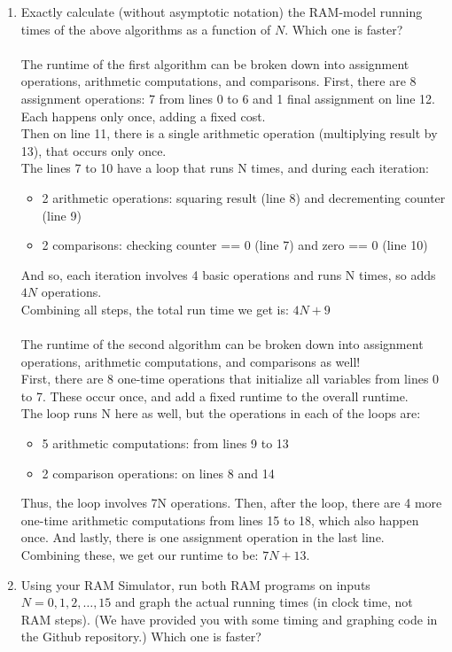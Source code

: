 \documentclass[11pt]{article}
\begin{document}
\begin{enumerate}
\begin{enumerate}
    \item Exactly calculate (without asymptotic notation) the RAM-model running times of the above algorithms as a function of $N$.
    Which one is faster? \label{itm:RAMtime}    
    \\\\
    The runtime of the first algorithm can be broken down into assignment operations, arithmetic computations, and comparisons. First, there are 8 assignment operations: 7 from lines 0 to 6 and 1 final assignment on line 12. Each happens only once, adding a fixed cost. 
    \\ Then on line 11, there is a single arithmetic operation (multiplying result by 13), that occurs only once.
    \\ The lines 7 to 10 have a loop that runs N times, and during each iteration:
    \begin{itemize}
        \item 2 arithmetic operations: squaring result (line 8) and decrementing counter (line 9)
        \item 2 comparisons: checking counter == 0 (line 7) and zero == 0 (line 10)
    \end{itemize}
    And so, each iteration involves 4 basic operations and runs N times, so adds $4N$ operations.
    \\ Combining all steps, the total run time we get is: $4N + 9$
    \\\\ The runtime of the second algorithm can be broken down into assignment operations, arithmetic computations, and comparisons as well! 
    \\ First, there are 8 one-time operations that initialize all variables from lines 0 to 7. These occur once, and add a fixed runtime to the overall runtime.
    \\ The loop runs N here as well, but the operations in each of the loops are:
    \begin{itemize}
        \item 5 arithmetic computations: from lines 9 to 13
        \item 2 comparison operations: on lines 8 and 14
    \end{itemize}
    Thus, the loop involves 7N operations. Then, after the loop, there are 4 more one-time arithmetic computations from lines 15 to 18, which also happen once. And lastly, there is one assignment operation in the last line.
    \\ Combining these, we get our runtime to be: $7N + 13$.
    \item Using your RAM Simulator, run both RAM programs on inputs $N=0,1,2,\ldots,15$ and graph the actual running times (in clock time, not RAM steps).  (We have provided you with some timing and graphing code in the Github repository.) Which one is faster?  \label{itm:realtime} 


\end{enumerate}
\end{enumerate}
\end{document}
